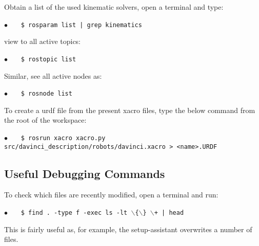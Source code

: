 Obtain a list of the used kinematic solvers, open a terminal and type:

\hspace{1cm} \textbf{$\bullet$} \ \ \  \texttt{\$ rosparam list | grep kinematics} \ \ \ {} 

view to all active topics:

\hspace{1cm} \textbf{$\bullet$} \ \ \  \texttt{\$ rostopic list} \ \ \ {} 

Similar, see all active nodes as: 

\hspace{1cm} \textbf{$\bullet$} \ \ \  \texttt{\$ rosnode list} \ \ \ {} 

To create a \gls{urdf} file from the present xacro files, type the below command from the root of the workspace:

\hspace{1cm} \textbf{$\bullet$} \ \ \  \texttt{\$ rosrun xacro xacro.py src/davinci\_description/robots/davinci.xacro > <name>.URDF} %
%
\subsection*{Useful Debugging Commands}
To check which files are recently modified, open a terminal and run:

\hspace{1cm} \textbf{$\bullet$} \ \ \  \texttt{\$ find . -type f -exec ls -lt $\backslash$\{$\backslash$\} $\backslash$+ | head} 

This is fairly useful as, for example, the setup-assistant overwrites a number of files. 

{}{}